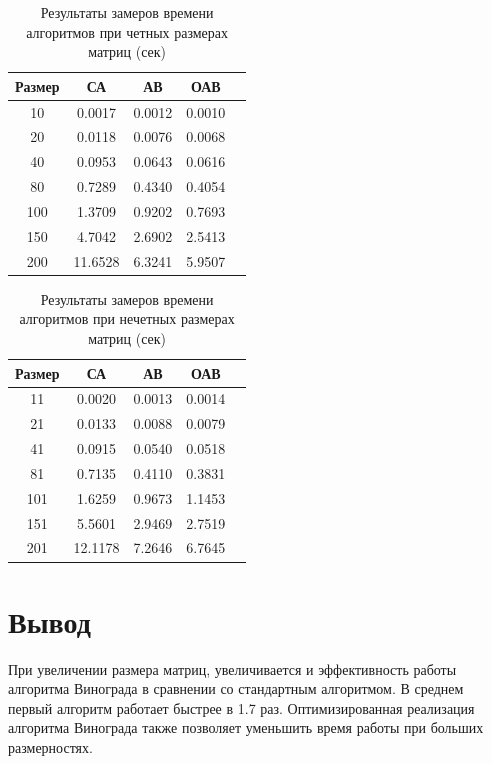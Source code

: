 \begin{table}[h]
	\begin{center}
		\caption{\label{tab:time1}Результаты замеров времени алгоритмов при четных размерах матриц (сек)}
		\begin{tabular}{|c|c|c|c|c|}
		\hline
		Размер & СА &  АВ & ОАВ \\
		\hline
		10  & 0.0017 & 0.0012 & 0.0010\\
		\hline
		20  & 0.0118 & 0.0076 & 0.0068\\
		\hline
		40  & 0.0953 & 0.0643 & 0.0616 \\
		\hline
		80  & 0.7289 & 0.4340 & 0.4054 \\
		\hline
		100  & 1.3709 & 0.9202 & 0.7693 \\
		\hline
		150  & 4.7042 & 2.6902 & 2.5413 \\
		\hline
		200  & 11.6528 & 6.3241 & 5.9507 \\
		\hline
		
		\end{tabular}
	\end{center}
\end{table}

\begin{table}[h]
	\begin{center}
		\caption{\label{tab:time2}Результаты замеров времени алгоритмов при нечетных размерах матриц (сек)}
		\begin{tabular}{|c|c|c|c|c|}
		\hline
		Размер & СА &  АВ & ОАВ \\
		\hline
		11  & 0.0020 & 0.0013 & 0.0014\\
		\hline
		21  & 0.0133 & 0.0088 & 0.0079\\
		\hline
		41  & 0.0915 & 0.0540 & 0.0518 \\
		\hline
		81  & 0.7135 & 0.4110 & 0.3831 \\
		\hline
		101  & 1.6259 & 0.9673 & 1.1453 \\
		\hline
		151  & 5.5601 & 2.9469 & 2.7519 \\
		\hline
		201  & 12.1178 & 7.2646 & 6.7645 \\
		\hline		
		\end{tabular}
	\end{center}
\end{table}


\section*{Вывод}
При увеличении размера матриц, увеличивается и эффективность работы алгоритма Винограда в сравнении со стандартным алгоритмом. В среднем первый алгоритм работает быстрее в 1.7 раз. Оптимизированная реализация алгоритма Винограда также позволяет уменьшить время работы при больших размерностях. 

